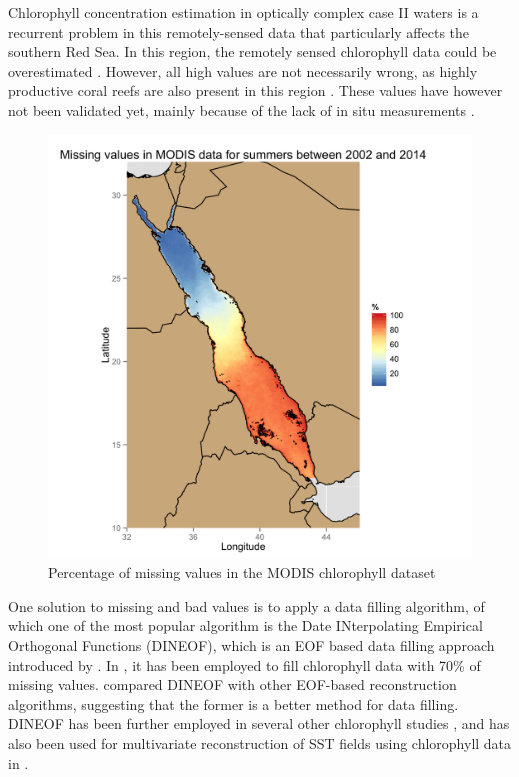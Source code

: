 Chlorophyll concentration estimation in optically complex case II waters is a
recurrent problem in this remotely-sensed data that particularly affects the
southern Red Sea.  In this region, the remotely sensed chlorophyll data could
be overestimated \citep{Raitsos2013}. However, all high values are not
necessarily wrong, as highly productive coral reefs are also present in this
region \citep{Raitsos2013}. These values have however not been validated yet,
mainly because of the lack of in situ measurements \citep{Raitsos2013}.

\begin{figure}[h]
    \centering
    \includegraphics[scale=.15]{figures/modis_missing_values_summer.png}
    \caption{Percentage of missing values in the MODIS chlorophyll dataset}
    \label{misval_modis}
\end{figure}

One solution to missing and bad values is to apply a data filling algorithm, of
which one of the most popular algorithm is the Date INterpolating Empirical
Orthogonal Functions (DINEOF), which is an EOF based data filling approach
introduced by \citet{Beckers2003}. In \citet{Sicarjobs2011}, it has been
employed to fill chlorophyll data with 70\% of missing values.
\citet{Taylor2013} compared DINEOF with other EOF-based reconstruction
algorithms, suggesting that the former is a better method for data filling.
DINEOF has been further employed in several other chlorophyll studies
\citep{Miles2010, Waite2013}, and has also been used for multivariate
reconstruction of SST fields using chlorophyll data in \citet{Alvera2007}. 

